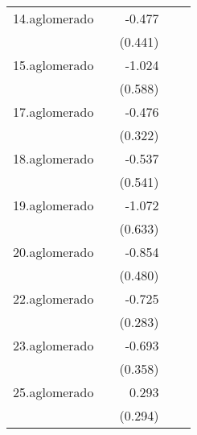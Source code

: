 {\begin{longtable}{l*{4}{D{.}{.}{-1}}}
\addlinespace
14.aglomerado&                     &      -0.477         &                     &                     \\
            &                     &     (0.441)         &                     &                     \\
\addlinespace
15.aglomerado&                     &      -1.024         &                     &                     \\
            &                     &     (0.588)         &                     &                     \\
\addlinespace
17.aglomerado&                     &      -0.476         &                     &                     \\
            &                     &     (0.322)         &                     &                     \\
\addlinespace
18.aglomerado&                     &      -0.537         &                     &                     \\
            &                     &     (0.541)         &                     &                     \\
\addlinespace
19.aglomerado&                     &      -1.072         &                     &                     \\
            &                     &     (0.633)         &                     &                     \\
\addlinespace
20.aglomerado&                     &      -0.854         &                     &                     \\
            &                     &     (0.480)         &                     &                     \\
\addlinespace
22.aglomerado&                     &      -0.725\sym{*}  &                     &                     \\
            &                     &     (0.283)         &                     &                     \\
\addlinespace
23.aglomerado&                     &      -0.693         &                     &                     \\
            &                     &     (0.358)         &                     &                     \\
\addlinespace
25.aglomerado&                     &       0.293         &                     &                     \\
            &                     &     (0.294)         &                     &                     \\

\end{longtable}}
